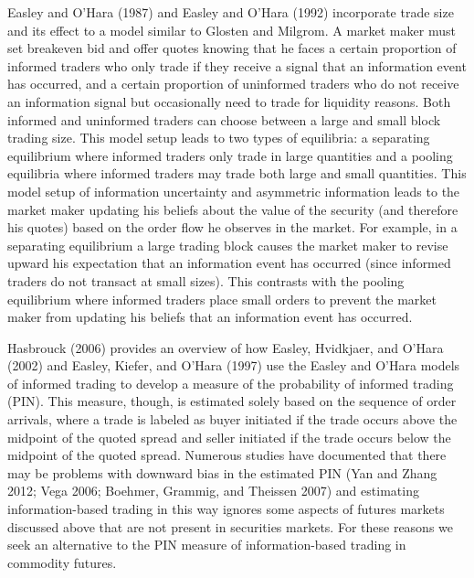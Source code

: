 \documentclass[]{elsarticle} %
\begin{document}
Easley and O'Hara (1987) and Easley and O'Hara (1992) incorporate trade
size and its effect to a model similar to Glosten and Milgrom. A market
maker must set breakeven bid and offer quotes knowing that he faces a
certain proportion of informed traders who only trade if they receive a
signal that an information event has occurred, and a certain proportion
of uninformed traders who do not receive an information signal but
occasionally need to trade for liquidity reasons. Both informed and
uninformed traders can choose between a large and small block trading
size. This model setup leads to two types of equilibria: a separating
equilibrium where informed traders only trade in large quantities and a
pooling equilibria where informed traders may trade both large and small
quantities. This model setup of information uncertainty and asymmetric
information leads to the market maker updating his beliefs about the
value of the security (and therefore his quotes) based on the order flow
he observes in the market. For example, in a separating equilibrium a
large trading block causes the market maker to revise upward his
expectation that an information event has occurred (since informed
traders do not transact at small sizes). This contrasts with the pooling
equilibrium where informed traders place small orders to prevent the
market maker from updating his beliefs that an information event has
occurred.

Hasbrouck (2006) provides an overview of how Easley, Hvidkjaer, and
O'Hara (2002) and Easley, Kiefer, and O'Hara (1997) use the Easley and
O'Hara models of informed trading to develop a measure of the
probability of informed trading (PIN). This measure, though, is
estimated solely based on the sequence of order arrivals, where a trade
is labeled as buyer initiated if the trade occurs above the midpoint of
the quoted spread and seller initiated if the trade occurs below the
midpoint of the quoted spread. Numerous studies have documented that
there may be problems with downward bias in the estimated PIN (Yan and
Zhang 2012; Vega 2006; Boehmer, Grammig, and Theissen 2007) and
estimating information-based trading in this way ignores some aspects of
futures markets discussed above that are not present in securities
markets. For these reasons we seek an alternative to the PIN measure of
information-based trading in commodity futures.
\end{document}
